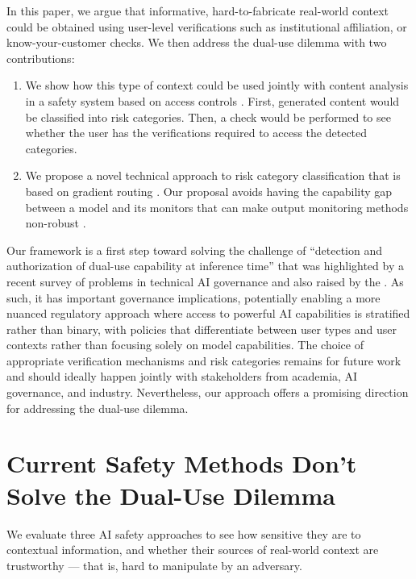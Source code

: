 \documentclass{article}
\theoremstyle{plain}
\theoremstyle{definition}
\theoremstyle{remark}
\begin{document}
In this paper, we argue that informative, hard-to-fabricate
real-world context could be obtained using user-level verifications
such as institutional affiliation, or know-your-customer checks. We
then address the dual-use dilemma with two contributions:
\begin{enumerate}
  \item We show how this type of context could be used jointly with content analysis in a safety system based on access controls \cite{butler1974}. First, generated content would be classified into risk categories. Then, a check would be performed to see whether the user has the verifications required to access the detected categories.
  \item We propose a novel technical approach to risk
    category classification that is based on gradient routing \cite{cloud2024gradientroutingmaskinggradients}. Our proposal avoids having the capability gap between a model and its monitors that can make output monitoring methods non-robust \cite{jin2024jailbreakinglargelanguagemodels}.
\end{enumerate}

Our framework is a first step toward solving the challenge of ``detection and authorization of dual-use capability at inference time'' that was highlighted by a recent survey of problems in technical AI governance \cite{reuel2025openproblemstechnicalai} and also raised by the \citet{NIST_AI_800_1_ipd_2024}.
As such, it has important governance implications, potentially enabling a more nuanced regulatory approach where access to powerful AI capabilities is stratified rather than binary, with policies that differentiate between user types and user contexts rather than focusing solely on model capabilities.
The choice of appropriate verification mechanisms and risk categories remains for future work and should ideally happen jointly with stakeholders from academia, AI governance, and industry.
Nevertheless, our approach offers a promising direction for addressing the dual-use dilemma.

\section{Current Safety Methods Don't Solve the Dual-Use Dilemma}
\label{section:current-methods}

We evaluate three AI safety approaches to see how sensitive they are
to contextual information, and whether their sources of real-world
context are trustworthy --- that is, hard to manipulate by an adversary.
\end{document}

